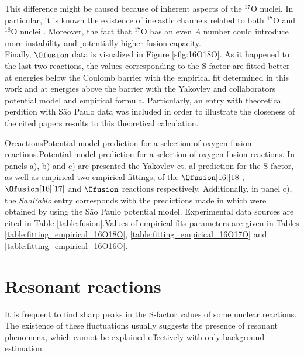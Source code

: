 \documentclass[openany]{book}
\begin{document}
This difference might be caused because of inherent aspects of the $\mathrm{{}^{17}O}$ nuclei. In particular, it is known the existence of inelastic channels related to both $\mathrm{{}^{17}O}$ and $\mathrm{{}^{18}O}$ nuclei \cite{kovar_geesaman_braid_eisen_henning_ophel_paul_rehm_sanders_sperr_et_1979}. Moreover, the fact that $\mathrm{{}^{17}O}$ has an even $A$ number could introduce more instability and potentially higher fusion capacity. \\

Finally,  $\Ofusion$ data is visualized in Figure \ref{sfig:16O18O}. As it happened to the last two reactions, the values corresponding to the S-factor are fitted better at energies below the Coulomb barrier with the empirical fit determined in this work and at energies above the barrier with the Yakovlev and collaborators potential model and empirical formula. Particularly, an entry with theoretical perdition with São Paulo data was included in order to illustrate the closeness of the cited papers results to this theoretical calculation. 


{Oreactions}{Potential model prediction for a selection of oxygen fusion reactions.}{Potential model prediction for a selection of oxygen fusion reactions. In panels a), b) and c) are presented the  Yakovlev et. al prediction for the S-factor, as well as empirical two empirical fittings,  of the $\Ofusion[16][18]$, $\Ofusion[16][17]$ and $\Ofusion$ reactions respectively. Additionally, in panel c), the \textit{SaoPablo} entry corresponds with the predictions made in \cite{yakovlev_beard_gasques_wiescher_2010} which were obtained by using the São Paulo potential model. Experimental data sources are cited in Table \ref{table:fusion}.Values of empirical fits parameters are given in Tables \ref{table:fitting_empirical_16O18O}, \ref{table:fitting_empirical_16O17O} and \ref{table:fitting_empirical_16O16O}.}


\section{Resonant reactions} \label{sec:resonant}

It is frequent to find sharp peaks in the S-factor values of some nuclear reactions. The existence of these fluctuations usually suggests the presence of resonant phenomena, which cannot be explained effectively with only background estimation. \\
\end{document}
